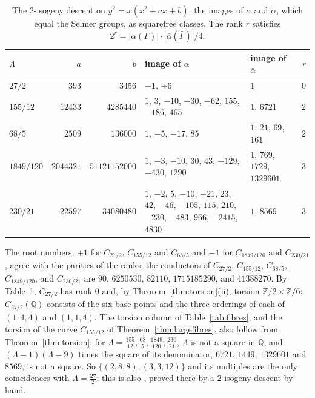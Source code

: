 \documentclass[11pt]{amsart}
\theoremstyle{definition}
\theoremstyle{remark}
\newcommand{\Q}{\mathbb{Q}}
\newcommand{\Z}{\mathbb{Z}}
\begin{document}
\begin{table}[t]
\caption{The $2$-isogeny descent on $y^2=x(x^2+ax+b)$: the images of $\alpha$ and $\bar\alpha$, which equal the Selmer groups, as squarefree classes. The rank $r$ satisfies $2^r=|\alpha(\Gamma)|\cdot|\bar\alpha(\bar\Gamma)|/4$.}\label{tab:selmer}
\centering\footnotesize\setlength{\tabcolsep}{4pt}
\begin{tabular}{@{}lrr>{\raggedright\arraybackslash}p{}>{\raggedright\arraybackslash}p{}r@{}}
\toprule
$\Lambda$ & $a$ & $b$ & image of $\alpha$ & image of $\bar\alpha$ & $r$\\
\midrule
$27/2$ & $393$ & $3456$ & $\pm1$, $\pm6$ & $1$ & $0$\\
$155/12$ & $12433$ & $4285440$ & $1$, $3$, $-10$, $-30$, $-62$, $155$, $-186$, $465$ & $1$, $6721$ & $2$\\
$68/5$ & $2509$ & $136000$ & $1$, $-5$, $-17$, $85$ & $1$, $21$, $69$, $161$ & $2$\\
$1849/120$ & $2044321$ & $51121152000$ & $1$, $-3$, $-10$, $30$, $43$, $-129$, $-430$, $1290$ & $1$, $769$, $1729$, $1329601$ & $3$\\
$230/21$ & $22597$ & $34080480$ & $1$, $-2$, $5$, $-10$, $-21$, $23$, $42$, $-46$, $-105$, $115$, $210$, $-230$, $-483$, $966$, $-2415$, $4830$ & $1$, $8569$ & $3$\\
\bottomrule
\end{tabular}
\end{table}

 The root numbers, $+1$ for $C_{27/2}$, $C_{155/12}$ and $C_{68/5}$ and $-1$ for $C_{1849/120}$ and $C_{230/21}$, agree with the parities of the ranks; the conductors of $C_{27/2}$, $C_{155/12}$, $C_{68/5}$, $C_{1849/120}$, and $C_{230/21}$ are $90$, $6250530$, $82110$, $1715185290$, and $41388270$. By Table~\ref{tab:selmer}, $C_{27/2}$ has rank $0$ and, by Theorem~\ref{thm:torsion}(ii), torsion $\Z/2\times\Z/6$: $C_{27/2}(\Q)$ consists of the six base points and the three orderings of each of $(1,4,4)$ and $(1,1,4)$. The torsion column of Table~\ref{tab:fibres}, and the torsion of the curve $C_{155/12}$ of Theorem~\ref{thm:largefibres}, also follow from Theorem~\ref{thm:torsion}: for $\Lambda=\frac{155}{12},\frac{68}5,\frac{1849}{120},\frac{230}{21}$, $\Lambda$ is not a square in $\Q$, and $(\Lambda-1)(\Lambda-9)$ times the square of its denominator, $6721$, $1449$, $1329601$ and $8569$, is not a square. So $\{(2,8,8),(3,3,12)\}$ and its multiples are the only coincidences with $\Lambda=\frac{27}2$; this is also \cite[Theorem~5.11]{gangetal-heat}, proved there by a $2$-isogeny descent by hand.
\end{document}
